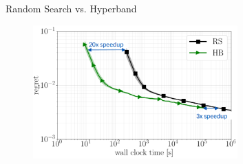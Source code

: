 \begin{frame}{Random Search vs. Hyperband}
\begin{figure}
    \centering
    \includegraphics[width=0.7\textwidth]{w07_hpo_grey_box/images/hyperband/bohb_2.png}
\end{figure}

    
\end{frame}

